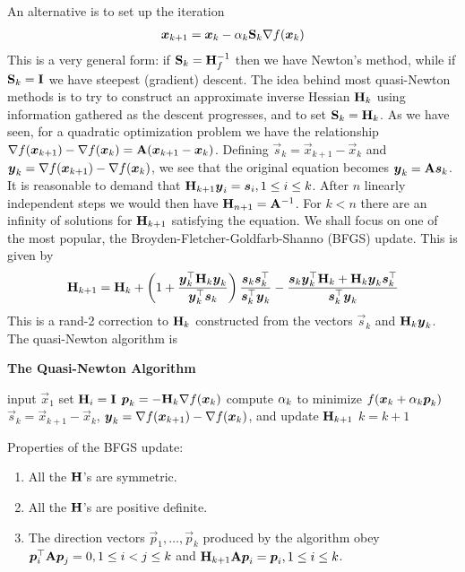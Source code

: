 An alternative is to set up the iteration
\begin{align*}
	\boldsymbol{x}_{k+1}=\boldsymbol{x}_k-\alpha_k\mathbf{S}_k\nabla f(\boldsymbol{x}_k)
\end{align*}
This is a very general form: if $\mathbf{S}_k=\mathbf{H}_f^{-1}$ then we have Newton's method, while if $\mathbf{S}_k=\mathbf{I}$ we have steepest (gradient) descent. The idea behind most quasi-Newton methods is to try to construct an approximate inverse Hessian $\mathbf{H}_k$ using information gathered as the descent progresses, and to set $\mathbf{S}_k=\mathbf{H}_k$. As we have seen, for a quadratic optimization problem we have the relationship $\nabla f(\boldsymbol{x}_{k+1})-\nabla f(\boldsymbol{x}_k)=\mathbf{A}(\boldsymbol{x}_{k+1}-\boldsymbol{x}_k)$. Defining $\vec{s}_k=\vec{x}_{k+1}-\vec{x}_k$ and $\boldsymbol{y}_k=\nabla f(\boldsymbol{x}_{k+1})-\nabla f(\boldsymbol{x}_k)$, we see that the original equation becomes $\boldsymbol{y}_k=\mathbf{A}\boldsymbol{s}_k$. It is reasonable to demand that $\mathbf{H}_{k+1}\boldsymbol{y}_i=\boldsymbol{s}_i,1\leq i\leq k$. After $n$ linearly independent steps we would then have $\mathbf{H}_{n+1}=\mathbf{A}^{-1}$. For $k<n$ there are an infinity of solutions for $\mathbf{H}_{k+1}$ satisfying the equation. We shall focus on one of the most popular, the Broyden-Fletcher-Goldfarb-Shanno (BFGS) update. This is given by
\begin{align*}
	\mathbf{H}_{k+1}=\mathbf{H}_k+\left(1+\frac{\boldsymbol{y}_k^\top\mathbf{H}_k\boldsymbol{y}_k}{\boldsymbol{y}_k^\top\boldsymbol{s}_k}\right)\frac{\boldsymbol{s}_k\boldsymbol{s}_k^\top}{\boldsymbol{s}_k^\top\boldsymbol{y}_k}-\frac{\boldsymbol{s}_k\boldsymbol{y}_k^\top\mathbf{H}_k+\mathbf{H}_k\boldsymbol{y}_k\boldsymbol{s}_k^\top}{\boldsymbol{s}_k^\top\boldsymbol{y}_k}
\end{align*}
This is a rand-2 correction to $\mathbf{H}_k$ constructed from the vectors $\vec{s}_k$ and $\mathbf{H}_k\boldsymbol{y}_k$. The quasi-Newton algorithm is
\begin{algorithm}[H]
	\caption*{\bf The Quasi-Newton Algorithm}
	\begin{algorithmic}
		\State input $\vec{x}_1$
		\State set $\mathbf{H}_i=\mathbf{I}$
			\State $\boldsymbol{p}_k=-\mathbf{H}_k\nabla f(\boldsymbol{x}_k)$
			\State compute $\alpha_k$ to minimize $f(\boldsymbol{x}_k+\alpha_k\boldsymbol{p}_k)$
			\State $\vec{s}_k=\vec{x}_{k+1}-\vec{x}_k$, $\boldsymbol{y}_k=\nabla f(\boldsymbol{x}_{k+1})-\nabla f(\boldsymbol{x}_k)$, and update $\mathbf{H}_{k+1}$
			\State $k=k+1$
		\EndFor
	\end{algorithmic}
\end{algorithm}
Properties of the BFGS update:
\begin{enumerate}
	\item All the $\mathbf{H}$'s are symmetric.
	\item All the $\mathbf{H}$'s are positive definite.
	\item The direction vectors $\vec{p}_1,\dotsc,\vec{p}_k$ produced by the algorithm obey $\boldsymbol{p}_i^\top\mathbf{A}\boldsymbol{p}_j=0,1\leq i<j\leq k$ and $\mathbf{H}_{k+1}\mathbf{A}\boldsymbol{p}_i=\boldsymbol{p}_i,1\leq i\leq k$.
\end{enumerate}

